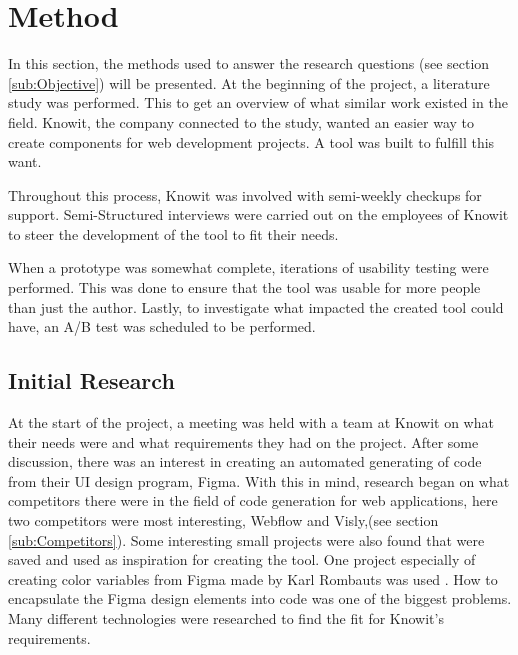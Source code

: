\section{Method}

In this section, the methods used to answer the research questions (see section \ref{sub:Objective}) will be presented. At the beginning of the project, a literature study was performed. This to get an overview of what similar work existed in the field. Knowit, the company connected to the study, wanted an easier way to create components for web development projects. A tool was built to fulfill this want. 

Throughout this process, Knowit was involved with semi-weekly checkups for support. Semi-Structured interviews were carried out on the employees of Knowit to steer the development of the tool to fit their needs. 

When a prototype was somewhat complete, iterations of usability testing were performed. This was done to ensure that the tool was usable for more people than just the author. Lastly, to investigate what impacted the created tool could have, an A/B test was scheduled to be performed.

\subsection{Initial Research}%
\label{sub:Initial Research}

At the start of the project, a meeting was held with a team at Knowit on what their needs were and what requirements they had on the project. After some discussion, there was an interest in creating an automated generating of code from their UI design program, Figma. With this in mind, research began on what competitors there were in the field of code generation for web applications, here two competitors were most interesting, Webflow and Visly,(see section \ref{sub:Competitors}). Some interesting small projects were also found that were saved and used as inspiration for creating the tool. One project especially of creating color variables from Figma made by Karl Rombauts was used \cite{rombautsKarlRombautsFigmaSCSSGenerator2021}. How to encapsulate the Figma design elements into code was one of the biggest problems. Many different technologies were researched to find the fit for Knowit's requirements.


